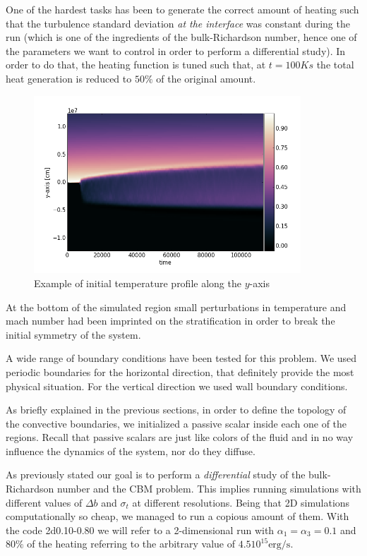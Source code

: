 One of the hardest tasks has been to generate the correct amount of heating such that the turbulence standard deviation \textit{at the interface} was constant during the run (which is one of the ingredients of the bulk-Richardson number, hence one of the parameters we want to control in order to perform a differential study). In order to do that, the heating function is tuned such that, at $t=100K s$ the total heat generation is reduced to $50 \%$ of the original amount.

\begin{figure}[t]
\centering
\includegraphics[width=10cm]{./img/tempprofile}
\caption{Example of initial temperature profile along the $y$-axis}
\label{fig:tempprofile}
\centering
\end{figure}
At the bottom of the simulated region small perturbations in temperature and mach number had been imprinted on the stratification in order to break the initial symmetry of the system.

A wide range of boundary conditions have been tested for this problem. We used periodic boundaries for the horizontal direction, that definitely provide the most physical situation. For the vertical direction we used wall boundary conditions.

As briefly explained in the previous sections, in order to define the topology of the convective boundaries, we initialized a passive scalar inside each one of the regions. Recall that passive scalars are just like colors of the fluid and in no way influence the dynamics of the system, nor do they diffuse.

As previously stated our goal is to perform a \textit{differential} study of the bulk-Richardson number and the CBM problem. This implies running simulations with different values of $\Delta b$ and $\sigma_t$ at different resolutions. Being that 2D simulations computationally so cheap, we managed to run a copious amount of them. With the code 2d0.10-0.80 we will refer to a 2-dimensional run with $\alpha_{1} = \alpha_{3}=0.1$ and $80 \%$ of the heating referring to the arbitrary value of $4.5 10^{15} \mathrm{erg/s}$.

